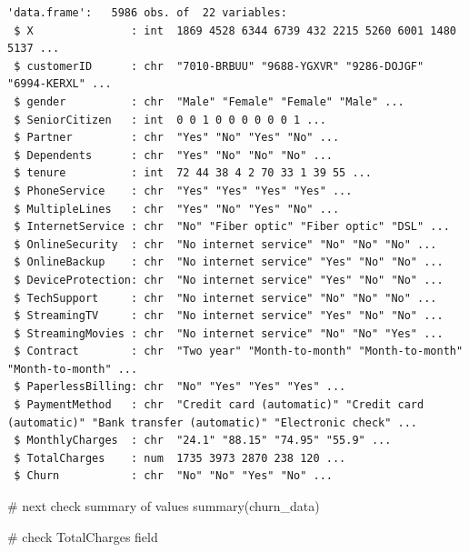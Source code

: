 \documentclass[
  letterpaper,
  DIV=11,
  numbers=noendperiod]{scrreprt}
\newenvironment{Shaded}{\begin{snugshade}}{\end{snugshade}}
\newcommand{\CommentTok}[1]{\textcolor[rgb]{0.37,0.37,0.37}{#1}}
\newcommand{\FunctionTok}[1]{\textcolor[rgb]{0.28,0.35,0.67}{#1}}
\newcommand{\NormalTok}[1]{\textcolor[rgb]{0.00,0.23,0.31}{#1}}
\begin{document}
\begin{verbatim}
'data.frame':   5986 obs. of  22 variables:
 $ X               : int  1869 4528 6344 6739 432 2215 5260 6001 1480 5137 ...
 $ customerID      : chr  "7010-BRBUU" "9688-YGXVR" "9286-DOJGF" "6994-KERXL" ...
 $ gender          : chr  "Male" "Female" "Female" "Male" ...
 $ SeniorCitizen   : int  0 0 1 0 0 0 0 0 0 1 ...
 $ Partner         : chr  "Yes" "No" "Yes" "No" ...
 $ Dependents      : chr  "Yes" "No" "No" "No" ...
 $ tenure          : int  72 44 38 4 2 70 33 1 39 55 ...
 $ PhoneService    : chr  "Yes" "Yes" "Yes" "Yes" ...
 $ MultipleLines   : chr  "Yes" "No" "Yes" "No" ...
 $ InternetService : chr  "No" "Fiber optic" "Fiber optic" "DSL" ...
 $ OnlineSecurity  : chr  "No internet service" "No" "No" "No" ...
 $ OnlineBackup    : chr  "No internet service" "Yes" "No" "No" ...
 $ DeviceProtection: chr  "No internet service" "Yes" "No" "No" ...
 $ TechSupport     : chr  "No internet service" "No" "No" "No" ...
 $ StreamingTV     : chr  "No internet service" "Yes" "No" "No" ...
 $ StreamingMovies : chr  "No internet service" "No" "No" "Yes" ...
 $ Contract        : chr  "Two year" "Month-to-month" "Month-to-month" "Month-to-month" ...
 $ PaperlessBilling: chr  "No" "Yes" "Yes" "Yes" ...
 $ PaymentMethod   : chr  "Credit card (automatic)" "Credit card (automatic)" "Bank transfer (automatic)" "Electronic check" ...
 $ MonthlyCharges  : chr  "24.1" "88.15" "74.95" "55.9" ...
 $ TotalCharges    : num  1735 3973 2870 238 120 ...
 $ Churn           : chr  "No" "No" "Yes" "No" ...
\end{verbatim}

\begin{Shaded}
\begin{Highlighting}[]
\CommentTok{\# next check summary of values}
\FunctionTok{summary}\NormalTok{(churn\_data)}

\CommentTok{\# check TotalCharges field}
\end{Highlighting}
\end{Shaded}
\end{document}
